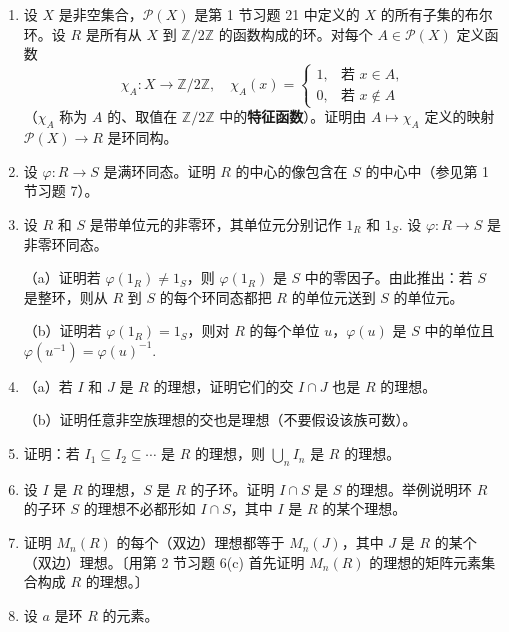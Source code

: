 \begin{enumerate}
\item 设 \(X\) 是非空集合，\(\mathcal{P}(X)\) 是第 1 节习题 21 中定义的 \(X\) 的所有子集的布尔环。设 \(R\) 是所有从 \(X\) 到 \(\mathbb{Z}/2\mathbb{Z}\) 的函数构成的环。对每个 \(A \in \mathcal{P}(X)\) 定义函数
\[
\chi_A : X \to \mathbb{Z}/2\mathbb{Z}, \quad \chi_A(x) = \begin{cases} 1, & \text{若 } x \in A, \\ 0, & \text{若 } x \notin A \end{cases}
\]
（\(\chi_A\) 称为 \(A\) 的、取值在 \(\mathbb{Z}/2\mathbb{Z}\) 中的\textbf{特征函数}）。证明由 \(A \mapsto \chi_A\) 定义的映射 \(\mathcal{P}(X) \to R\) 是环同构。

\item 设 \(\varphi : R \to S\) 是满环同态。证明 \(R\) 的中心的像包含在 \(S\) 的中心中（参见第 1 节习题 7）。

\item 设 \(R\) 和 \(S\) 是带单位元的非零环，其单位元分别记作 \(1_R\) 和 \(1_S\). 设 \(\varphi : R \to S\) 是非零环同态。

（a）证明若 \(\varphi(1_R) \neq 1_S\)，则 \(\varphi(1_R)\) 是 \(S\) 中的零因子。由此推出：若 \(S\) 是整环，则从 \(R\) 到 \(S\) 的每个环同态都把 \(R\) 的单位元送到 \(S\) 的单位元。

（b）证明若 \(\varphi(1_R) = 1_S\)，则对 \(R\) 的每个单位 \(u\)，\(\varphi(u)\) 是 \(S\) 中的单位且 \(\varphi(u^{-1}) = \varphi(u)^{-1}\).

\item （a）若 \(I\) 和 \(J\) 是 \(R\) 的理想，证明它们的交 \(I \cap J\) 也是 \(R\) 的理想。

（b）证明任意非空族理想的交也是理想（不要假设该族可数）。

\item 证明：若 \(I_1 \subseteq I_2 \subseteq \cdots\) 是 \(R\) 的理想，则 \(\bigcup_{n} I_n\) 是 \(R\) 的理想。

\item 设 \(I\) 是 \(R\) 的理想，\(S\) 是 \(R\) 的子环。证明 \(I \cap S\) 是 \(S\) 的理想。举例说明环 \(R\) 的子环 \(S\) 的理想不必都形如 \(I \cap S\)，其中 \(I\) 是 \(R\) 的某个理想。

\item 证明 \(M_n(R)\) 的每个（双边）理想都等于 \(M_n(J)\)，其中 \(J\) 是 \(R\) 的某个（双边）理想。〔用第 2 节习题 6(c) 首先证明 \(M_n(R)\) 的理想的矩阵元素集合构成 \(R\) 的理想。〕

\item 设 \(a\) 是环 \(R\) 的元素。


\end{enumerate}
